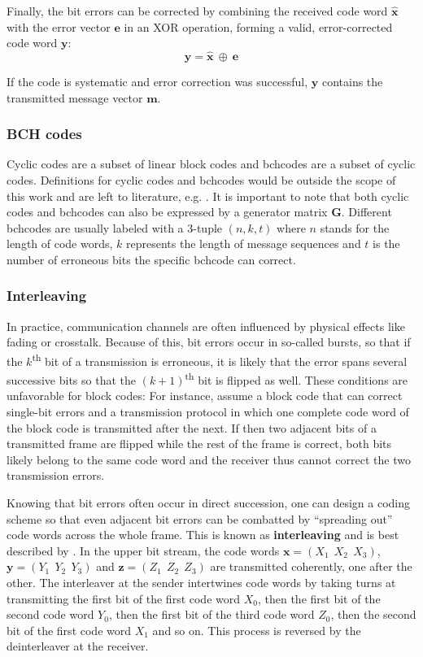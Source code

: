 Finally, the bit errors can be corrected by combining the received code word $\hat{\mathbf x}$ with the error vector $\mathbf e$ in an XOR operation, forming a valid, error-corrected code word $\mathbf y$:
\begin{equation}
	\mathbf y = \hat{\mathbf x} ~ \oplus ~ \mathbf e
\end{equation}

If the code is systematic and error correction was successful, $\mathbf y$ contains the transmitted message vector $\mathbf m$.

\subsubsection{BCH codes}
Cyclic codes are a subset of linear block codes and \glspl{bchcode} are a subset of cyclic codes.
Definitions for cyclic codes and \glspl{bchcode} would be outside the scope of this work and are left to literature, e.g. \cite[chapter 4]{ecctechniques}.
It is important to note that both cyclic codes and \glspl{bchcode} can also be expressed by a generator matrix $\mathbf G$.
Different \glspl{bchcode} are usually labeled with a 3-tuple $(n, k, t)$ where $n$ stands for the length of code words, $k$ represents the length of message sequences and $t$ is the number of erroneous bits the specific \gls{bchcode} can correct.

\subsubsection{Interleaving}
In practice, communication channels are often influenced by physical effects like fading or crosstalk.
Because of this, bit errors occur in so-called bursts, so that if the $k$\textsuperscript{th} bit of a transmission is erroneous, it is likely that the error spans several successive bits so that the $(k + 1)$\textsuperscript{th} bit is flipped as well.
These conditions are unfavorable for block codes:
For instance, assume a block code that can correct single-bit errors and a transmission protocol in which one complete code word of the block code is transmitted after the next.
If then two adjacent bits of a transmitted frame are flipped while the rest of the frame is correct, both bits likely belong to the same code word and the receiver thus cannot correct the two transmission errors.

Knowing that bit errors often occur in direct succession, one can design a coding scheme so that even adjacent bit errors can be combatted by ``spreading out'' code words across the whole frame.
This is known as \textbf{interleaving} and is best described by .
In the upper bit stream, the code words $\mathbf x = (X_1 ~~ X_2 ~~ X_3)$, $\mathbf y = (Y_1 ~~ Y_2 ~~ Y_3)$ and $\mathbf z = (Z_1 ~~ Z_2 ~~ Z_3)$ are transmitted coherently, one after the other.
The interleaver at the sender intertwines code words by taking turns at transmitting the first bit of the first code word $X_0$, then the first bit of the second code word $Y_0$, then the first bit of the third code word $Z_0$, then the second bit of the first code word $X_1$ and so on.
This process is reversed by the deinterleaver at the receiver.

